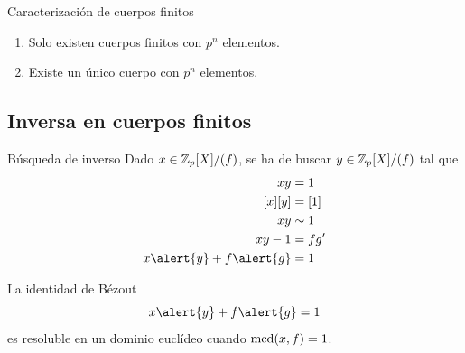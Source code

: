 \documentclass[10pt,t]{beamer}
\begin{document}
\begin{frame}
    \vspace{8em}
    \begin{teo}{Caracterización de cuerpos finitos}
        \vspace{0.5em}
        \begin{enumerate}[label=--]
            \item Solo existen cuerpos finitos con $p^n$ elementos.
            \item Existe un único cuerpo con $p^n$ elementos.
        \end{enumerate}
    \end{teo}
\end{frame}

\subsection{Inversa en cuerpos finitos}

\begin{frame}
    \begin{block}{\centering \large Búsqueda de inverso}
        Dado $x\in \mathbb{Z}_p[X]/(f)$, se ha de buscar $y\in \mathbb{Z}_p[X]/(f)$ tal que
        \setlength{\belowdisplayskip}{-1pt}   %
        \vspace{-0.5em}
        \begin{align*}
            \setlength{\itemsep}{-0.3em}
            xy      &= 1    \\
            [x][y]  &= [1]  \\
            xy      &\sim 1       \\
            xy - 1  &= fg'    \\
            x\alert{y} + f\alert{g}  &= 1    
        \end{align*}

    \end{block}

    \begin{prop}
        La identidad de Bézout \[x\alert{y} + f\alert{g}  = 1\] es resoluble en un dominio euclídeo cuando  $\text{mcd}(x,f) = 1$.
    \end{prop}

\end{frame}
\end{document}
